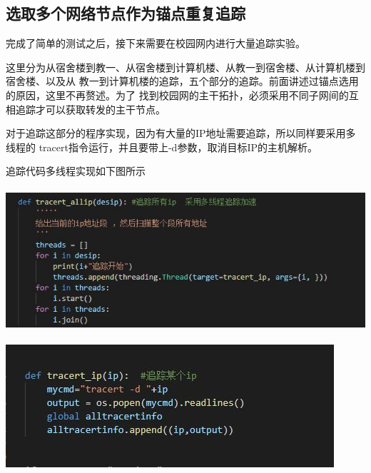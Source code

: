 \documentclass{article} %
\begin{document}
        \subsection{\Large 选取多个网络节点作为锚点重复追踪}
        \par 完成了简单的测试之后，接下来需要在校园网内进行大量追踪实验。
        \par 这里分为从宿舍楼到教一、从宿舍楼到计算机楼、从教一到宿舍楼、从计算机楼到宿舍楼、以及从
        教一到计算机楼的追踪，五个部分的追踪。前面讲述过锚点选用的原因，这里不再赘述。为了
        找到校园网的主干拓扑，必须采用不同子网间的互相追踪才可以获取转发的主干节点。
        \par 对于追踪这部分的程序实现，因为有大量的IP地址需要追踪，所以同样要采用多线程的
        tracert指令运行，并且要带上-d参数，取消目标IP的主机解析。
        \par 追踪代码多线程实现如下图所示\\
        \\
        \includegraphics[scale=0.7]{pic/追踪代码1.JPG}\\
        \\
         \includegraphics[scale=0.7]{pic/追踪代码2.JPG}
\end{document}
